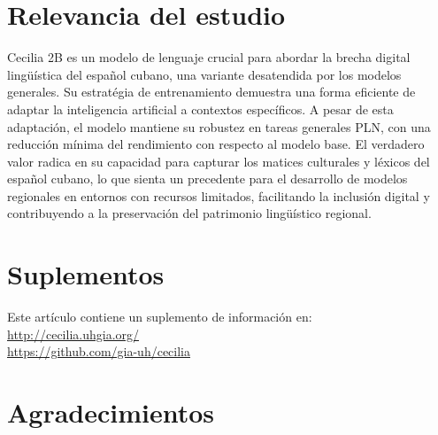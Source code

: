 \documentclass[10pt,twoside]{rcmart} %
\begin{document}
\section*{Relevancia del estudio} %

Cecilia 2B es un modelo de lenguaje crucial para abordar la brecha digital lingüística del español cubano, una variante desatendida por los modelos generales. Su estratégia de entrenamiento demuestra una forma eficiente de adaptar la inteligencia artificial a contextos específicos. A pesar de esta adaptación, el modelo mantiene su robustez en tareas generales PLN, con una reducción mínima del rendimiento con respecto al modelo base. El verdadero valor radica en su capacidad para capturar los matices culturales y léxicos del español cubano, lo que sienta un precedente para el desarrollo de modelos regionales en entornos con recursos limitados, facilitando la inclusión digital y contribuyendo a la preservación del patrimonio lingüístico regional.

\section*{Suplementos} %

	Este artículo contiene un suplemento de información en:\\
	\href{http://cecilia.uhgia.org/}{http://cecilia.uhgia.org/}\\
	\href{https://github.com/gia-uh/cecilia}{https://github.com/gia-uh/cecilia}

\section*{Agradecimientos} %
\end{document}
